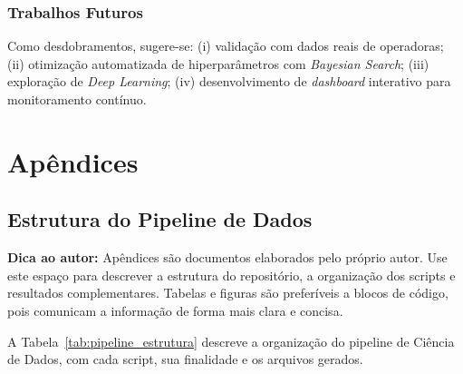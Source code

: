 \documentclass[
    12pt,
    oneside,
    a4paper,
    english,
    brazilian
    ]{abntex2}
\numberwithin{equation}{chapter}
\newenvironment{dica}{%
    \par\medskip
    \color{blue!60!black}\small\itshape
}{%
    \par\medskip
}
\begin{document}
\section*{Trabalhos Futuros}

Como desdobramentos, sugere-se: (i) validação com dados reais de operadoras; (ii) otimização automatizada de hiperparâmetros com \textit{Bayesian Search}; (iii) exploração de \textit{Deep Learning}; (iv) desenvolvimento de \textit{dashboard} interativo para monitoramento contínuo.

\newpage
{}
{}
\printindex

\newpage
\appendix
\part*{Apêndices}

\chapter{Estrutura do Pipeline de Dados}

\begin{dica}
\noindent\textbf{Dica ao autor:} Apêndices são documentos elaborados pelo próprio autor. Use este espaço para descrever a estrutura do repositório, a organização dos scripts e resultados complementares. Tabelas e figuras são preferíveis a blocos de código, pois comunicam a informação de forma mais clara e concisa.
\end{dica}

A Tabela~\ref{tab:pipeline_estrutura} descreve a organização do pipeline de Ciência de Dados, com cada script, sua finalidade e os arquivos gerados.
\end{document}
